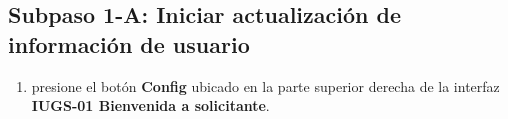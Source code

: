 \subsection{Subpaso 1-A: Iniciar actualización de información de usuario}
\begin{enumerate}
	\item presione el botón \textbf{Config} ubicado en la parte 
		superior derecha de la interfaz
		\textbf{IUGS-01 Bienvenida a solicitante}.
\end{enumerate}

	